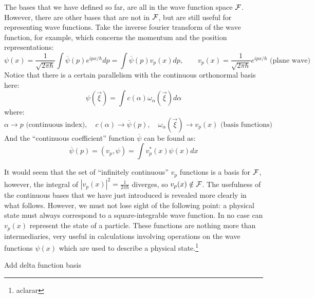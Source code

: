 The bases that we have defined so far, are all in the wave function space $\mathcal{F}$. However, there are other bases that are not in $\mathcal{F}$, but are still useful for representing wave functions. Take the inverse fourier transform of the wave function, for example, which concerns the momentum and the position representations:
\begin{equation}
    \psi(x) = \frac{1}{\sqrt{2\pi\hbar}}\int \overline\psi(p)e^{ip x/\hbar}d p = \int \overline\psi(p)v_p(x)dp, \qquad v_p(x) = \frac{1}{\sqrt{2\pi\hbar}}e^{ip x/\hbar} \text{ (plane wave)}
\end{equation}
Notice that there is a certain parallelism with the continuous orthonormal basis here:
\begin{equation}
    \psi(\vec{\xi}) = \int c(\alpha) \omega_\alpha(\vec{\xi})d\alpha
\end{equation}
where:
\begin{equation}
    \alpha \to p \text{ (continuous index)}, \quad c(\alpha) \to \overline\psi(p), \quad \omega_\alpha(\vec{\xi}) \to v_p(x) \text{ (basis functions)}
\end{equation}
And the ``continuous coefficient'' function $\overline\psi$ can be found as:
\begin{equation}
    \overline\psi(p) = (v_p, \psi) = \int v_p^*(x)\psi(x)dx
\end{equation}


It would seem that the set of ``infinitely continuous'' $v_p$ functions is a basis for $\mathcal{F}$, however, the integral of $\left|v_p(x)\right|^2 = \frac{1}{2\pi\hbar}$ diverges, so $v_p(x)\notin \mathcal{F}$. The usefulness of the continuous bases that we have just introduced is revealed more clearly in what follows. However, we must not lose sight of the following point: a physical state must always correspond to a square-integrable wave function. In no case can $v_p(x)$ represent the state of a particle. These functions are nothing more than intermediaries, very useful in calculations involving operations on the wave functions $\psi(x)$ which are used to describe a physical state.\footnote{\color{red}aclarar}

{\color{red}Add delta function basis}






